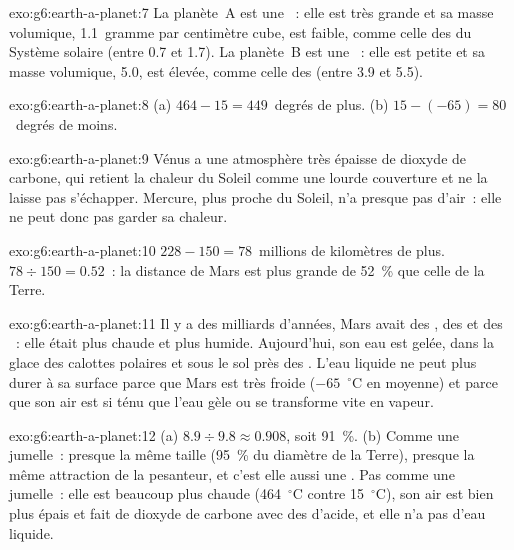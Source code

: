 \begin{solution}{exo:g6:earth-a-planet:7}
La planète~A est une ~: elle est très grande et sa masse
volumique, 1.1~gramme par centimètre cube, est faible, comme celle des
 du Système solaire (entre 0.7 et 1.7). La planète~B est
une ~: elle est petite et sa masse volumique, 5.0, est
élevée, comme celle des  (entre 3.9 et 5.5).
\end{solution}

\begin{solution}{exo:g6:earth-a-planet:8}
(a) $464 - 15 = 449$~degrés de plus. (b) $15 - (-65) = 80$~degrés de moins.
\end{solution}

\begin{solution}{exo:g6:earth-a-planet:9}
Vénus a une atmosphère très épaisse de dioxyde de carbone, qui retient la
chaleur du Soleil comme une lourde couverture et ne la laisse pas
s'échapper. Mercure, plus proche du Soleil, n'a presque pas d'air~: elle ne
peut donc pas garder sa chaleur.
\end{solution}

\begin{solution}{exo:g6:earth-a-planet:10}
$228 - 150 = 78$~millions de kilomètres de plus. $78 \div 150 = 0.52$~: la
distance de Mars est plus grande de 52~\% que celle de la Terre.
\end{solution}

\begin{solution}{exo:g6:earth-a-planet:11}
Il y a des milliards d'années, Mars avait des , des  et des
~: elle était plus chaude et plus humide. Aujourd'hui, son eau est
gelée, dans la glace des calottes polaires et sous le sol près des .
L'eau liquide ne peut plus durer à sa surface parce que Mars est très froide
($-65$~$^\circ$C en moyenne) et parce que son air est si ténu que l'eau
gèle ou se transforme vite en vapeur.
\end{solution}

\begin{solution}{exo:g6:earth-a-planet:12}
(a) $8.9 \div 9.8 \approx 0.908$, soit 91~\%. (b) Comme une jumelle~:
presque la même taille (95~\% du diamètre de la Terre), presque la même
attraction de la pesanteur, et c'est elle aussi une . Pas
comme une jumelle~: elle est beaucoup plus chaude (464~$^\circ$C contre
15~$^\circ$C), son air est bien plus épais et fait de dioxyde de carbone
avec des  d'acide, et elle n'a pas d'eau liquide.
\end{solution}

